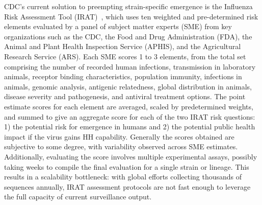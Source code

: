 \documentclass[onecolumn, compsoc,10pt]{IEEEtran}
\begin{document}
CDC's current solution to preempting strain-specific emergence  is the Influenza Risk Assessment Tool (IRAT)~\cite{Influenz24:online}, which  uses  ten weighted and pre-determined risk elements evaluated by a panel of 
%
 subject matter experts (SME) from  key organizations such as the CDC, the Food and Drug Administration (FDA), the Animal and Plant Health Inspection Service (APHIS), and the Agricultural Research Service (ARS). Each SME scores 1 to 3 elements, from the total set comprising the number of recorded human infections, transmission in laboratory animals, receptor binding characteristics, population immunity, infections in animals, genomic analysis, antigenic relatedness, global distribution in animals, disease severity and  pathogenesis, and antiviral treatment options. The point estimate scores for each  element are averaged, scaled by predetermined weights, and summed to give an aggregate score for each of the two IRAT risk questions: 1) the potential risk for emergence in humans and 2) the potential public health impact if the virus gains HH capability. Generally  the scores obtained are subjective to some degree, with  variability observed across SME  estimates. Additionally, evaluating the score  involves multiple experimental assays, possibly taking  weeks to compile the final  evaluation for a single strain or lineage. This results in  a scalability bottleneck: with   global  efforts   collecting  thousands of sequences annually,  IRAT assessment protocols are  not fast enough to leverage the full capacity of current surveillance output.%



\end{document}
